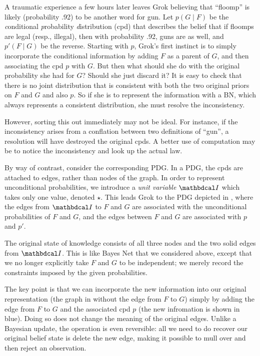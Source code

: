 \begin{example}
A traumatic experience a few hours later leaves Grok believing that
``floomp'' is likely (probability .92) to be another word for gun.
Let $p(G \mid F)$ be the \emph conditional \emph probability \emph
distribution (cpd) that describes 
the belief that if floomps are legal (resp., illegal),
then with probability .92, guns are as well, and $p'(F \mid G)$ be
the reverse. 
Starting with $p$, Grok's first instinct is to
simply incorporate the conditional information by adding $F$ as a parent of
$G$, and then associating
the cpd
$p$ with $G$. But then what should she do
with the original probability she had for $G$?  Should she just discard it?
It is easy to check that there is no 
joint distribution
that is consistent with
both
the two original priors on $F$ and $G$ and also 
$p$.  So if she
is to represent the information with a BN, which always represents a consistent
distribution, she must resolve the inconsistency. 





However,
sorting this out immediately may not be ideal.
For instance, if the inconsistency arises from a conflation between
two definitions 
of ``gun'', a resolution will have destroyed the original cpds. A
better use of computation may be to notice the inconsistency and look
up the actual law. 

By way of contrast, consider the corresponding PDG. In a PDG, the cpds are
attached to edges, rather than nodes of the graph.
In order to represent unconditional probabilities, we introduce
a \emph{unit variable} $\pdgunit$ which 
takes only one value, denoted
$\star$. 
This leads Grok to 
the PDG depicted in ,
where the edges from $\pdgunit$ to $F$ and $G$ are associated with the
unconditional probabilities of $F$ and $G$, and the 
edges between $F$ and $G$ are associated with $p$ and $p'$.



The original state of knowledge consists of all three nodes and the two
solid
edges from $\pdgunit$. This is like Bayes Net that we considered above,
except that we 
no longer
explicitly
take  $F$ and $G$ to be independent; we merely record the constraints
imposed by the given probabilities.  
	
The key point is that we can incorporate the new information into our original
representation (the graph in  without the edge from
$F$ to $G$) simply  by adding the edge from $F$ to $G$ and the associated cpd
$p$ (the new infromation is shown in blue).
Doing so does not change the meaning of the original edges.   
Unlike a Bayesian update, the operation is even reversible: all we need
to do recover our original belief state is delete the new edge, 
making it possible to mull over and then reject an observation.
\end{example}


